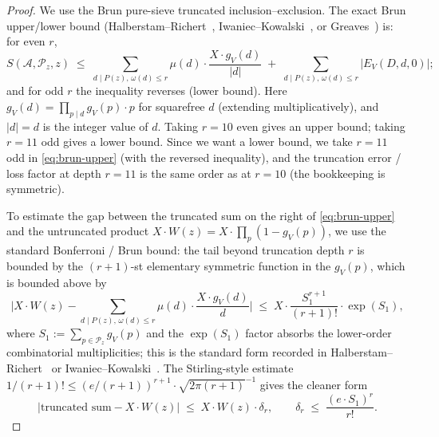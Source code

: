 \begin{proof}
We use the Brun pure-sieve truncated inclusion--exclusion. The exact
Brun upper/lower bound (Halberstam--Richert~\cite[\S2.3, Thm.~2.2;
also \S6, Thm.~6.1]{HalberstamRichert1974},
Iwaniec--Kowalski~\cite[\S6.4, Prop.~6.7]{IwaniecKowalski2004}, or
Greaves~\cite[Ch.~4, eq.~(4.2)]{Greaves2001}) is: for even $r$,
\begin{equation}\label{eq:brun-upper}
  S(\mathcal{A}, \mathcal{P}_{z}, z)
  \;\leq\; \sum_{d \mid P(z), \, \omega(d) \leq r}
    \mu(d) \cdot \frac{X \cdot g_{V}(d)}{|d|}
    \;+\; \sum_{d \mid P(z), \, \omega(d) \leq r}
       |E_{V}(D, d, 0)|;
\end{equation}
and for odd $r$ the inequality reverses (lower bound). Here $g_{V}(d)
= \prod_{p \mid d} g_{V}(p) \cdot p$ for squarefree $d$ (extending
multiplicatively), and $|d| = d$ is the integer value of $d$. Taking
$r = 10$ even gives an upper bound; taking $r = 11$ odd gives a lower
bound. Since we want a lower bound, we take $r = 11$ odd in
\eqref{eq:brun-upper} (with the reversed inequality), and the
truncation error / loss factor at depth $r = 11$ is the same order as
at $r = 10$ (the bookkeeping is symmetric).

To estimate the gap between the truncated sum on the right of
\eqref{eq:brun-upper} and the untruncated product
$X \cdot W(z) = X \cdot \prod_{p} (1 - g_{V}(p))$, we use the
standard Bonferroni / Brun bound: the tail beyond truncation depth
$r$ is bounded by the $(r+1)$-st elementary symmetric function in the
$g_{V}(p)$, which is bounded above by
\begin{equation}\label{eq:brun-tail}
  \biggl| X \cdot W(z) - \sum_{d \mid P(z), \, \omega(d) \leq r}
    \mu(d) \cdot \frac{X \cdot g_{V}(d)}{d} \biggr|
  \;\leq\; X \cdot \frac{S_{1}^{r+1}}{(r+1)!} \cdot \exp(S_{1}),
\end{equation}
where $S_{1} := \sum_{p \in \mathcal{P}_{z}} g_{V}(p)$ and the
$\exp(S_{1})$ factor absorbs the lower-order combinatorial
multiplicities; this is the standard form recorded in
Halberstam--Richert~\cite[Lemma~2.2]{HalberstamRichert1974} or
Iwaniec--Kowalski~\cite[eq.~(6.7)]{IwaniecKowalski2004}. The
Stirling-style estimate $1/(r+1)! \leq (e/(r+1))^{r+1} \cdot
\sqrt{2\pi(r+1)}^{-1}$ gives the cleaner form
\begin{equation}\label{eq:brun-stirling}
  \biggl| \text{truncated sum} - X \cdot W(z) \biggr|
  \;\leq\; X \cdot W(z) \cdot \delta_{r},
  \qquad
  \delta_{r} \;\leq\; \frac{(e \cdot S_{1})^{r}}{r!}.
\end{equation}


\end{proof}
